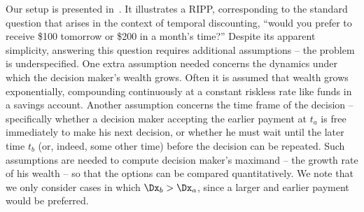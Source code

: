 Our setup is presented in~. It illustrates a RIPP, corresponding to the standard question that arises in the context of temporal discounting, \eg ``would you prefer to receive \$100 tomorrow or \$200 in a month's time?'' Despite its apparent simplicity, answering this question requires additional assumptions -- the problem is underspecified. One extra assumption needed concerns the dynamics under which the decision maker's wealth grows. Often it is assumed that wealth grows exponentially, compounding continuously at a constant riskless rate like funds in a savings account. Another assumption concerns the time frame of the decision -- specifically whether a decision maker accepting the earlier payment at $t_a$ is free immediately to make his next decision, or whether he must wait until the later time $t_b$ (or, indeed, some other time) before the decision can be repeated. Such assumptions are needed to compute decision maker's maximand -- the growth rate of his wealth -- so that the options can be compared quantitatively. We note that we only consider cases in which $\Dx_b > \Dx_a$, since a larger and earlier payment would be preferred.


